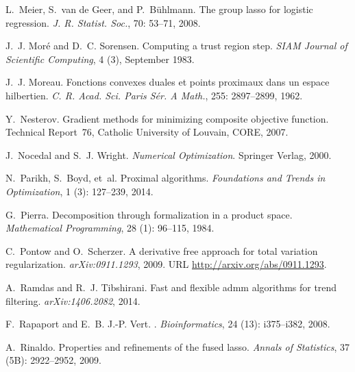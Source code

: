 \documentclass[twoside,11pt]{article}
\numberwithin{equation}{section}
\numberwithin{theorem}{section}
\begin{document}
\begin{thebibliography}{86}
L.~Meier, S.~{van de Geer}, and P.~B{\"u}hlmann.
\newblock The group lasso for logistic regression.
\newblock \emph{J. R. Statist. Soc.}, 70: 53--71, 2008.

J.~J. Mor{\'e} and D.~C. Sorensen.
\newblock Computing a trust region step.
\newblock \emph{SIAM Journal of Scientific Computing}, 4 (3),
  September 1983.

J.~J. Moreau.
\newblock Fonctions convexes duales et points proximaux dans un espace
  hilbertien.
\newblock \emph{C. R. Acad. Sci. Paris S{\'e}r. A Math.}, 255:
  2897--2899, 1962.

Y.~Nesterov.
\newblock Gradient methods for minimizing composite objective function.
\newblock Technical Report~76, Catholic University of Louvain, CORE, 2007.

J.~Nocedal and S.~J. Wright.
\newblock \emph{Numerical Optimization}.
\newblock Springer Verlag, 2000.

N.~Parikh, S.~Boyd, et~al.
\newblock Proximal algorithms.
\newblock \emph{Foundations and Trends{\textregistered} in Optimization},
  1 (3): 127--239, 2014.

G.~Pierra.
\newblock Decomposition through formalization in a product space.
\newblock \emph{Mathematical Programming}, 28 (1): 96--115,
  1984.

C.~Pontow and O.~Scherzer.
\newblock A derivative free approach for total variation regularization.
\newblock \emph{arXiv:0911.1293}, 2009.
\newblock URL \url{http://arxiv.org/abs/0911.1293}.

A.~Ramdas and R.~J. Tibshirani.
\newblock Fast and flexible admm algorithms for trend filtering.
\newblock \emph{arXiv:1406.2082}, 2014.

F.~Rapaport and E.~B. J.-P. Vert.
.
\newblock \emph{Bioinformatics}, 24 (13): i375--i382, 2008.

A.~Rinaldo.
\newblock Properties and refinements of the fused lasso.
\newblock \emph{Annals of Statistics}, 37 (5B): 2922--2952,
  2009.


\end{thebibliography}
\end{document}
